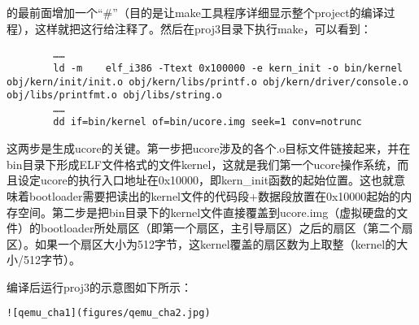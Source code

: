 的最前面增加一个``\#''（目的是让make工具程序详细显示整个project的编译过程），这样就把这行给注释了。然后在proj3目录下执行make，可以看到：

\begin{lstlisting}
        ……
        ld -m    elf_i386 -Ttext 0x100000 -e kern_init -o bin/kernel obj/kern/init/init.o obj/kern/libs/printf.o obj/kern/driver/console.o obj/libs/printfmt.o obj/libs/string.o
        ……
        dd if=bin/kernel of=bin/ucore.img seek=1 conv=notrunc
\end{lstlisting}

这两步是生成ucore的关键。第一步把ucore涉及的各个.o目标文件链接起来，并在bin目录下形成ELF文件格式的文件kernel，这就是我们第一个ucore操作系统，而且设定ucore的执行入口地址在0x10000，即kern\_init函数的起始位置。这也就意味着bootloader需要把读出的kernel文件的代码段+数据段放置在0x10000起始的内存空间。第二步是把bin目录下的kernel文件直接覆盖到ucore.img（虚拟硬盘的文件）的bootloader所处扇区（即第一个扇区，主引导扇区）之后的扇区（第二个扇区）。如果一个扇区大小为512字节，这kernel覆盖的扇区数为上取整（kernel的大小/512字节）。

编译后运行proj3的示意图如下所示：

\begin{lstlisting}
![qemu_cha1](figures/qemu_cha2.jpg)
\end{lstlisting}

